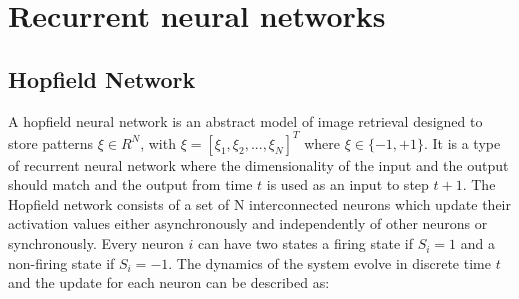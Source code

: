 \documentclass[conference,compsoc]{IEEEtran}
\begin{document}
  
    
%









\section{Recurrent neural networks}


\subsection{Hopfield Network}


A hopfield neural network is an abstract model of image retrieval designed to store patterns $\xi \in R^N$, with $\xi=[\xi_1, \xi_2,...,\xi_N]^T$ where $\xi \in \{-1,+1\}$. It is a type of recurrent neural network where the dimensionality of the input and the output should match and the output from time $t$ is used as an input to step $t+1$. The Hopfield network consists of a set of N interconnected neurons which update their activation values either asynchronously and independently of other neurons or synchronously. Every neuron $i$ can have two states a firing state if $S_i=1$ and a non-firing state if $S_i=-1$.
The dynamics of the system evolve in discrete time $t$ and the update for each neuron can be described as:
\end{document}
